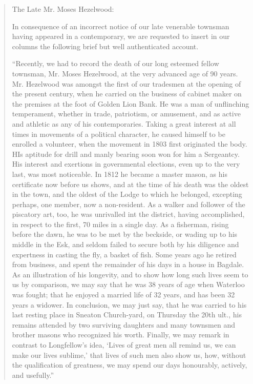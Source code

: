 \begin{quotation}
The Late Mr. Moses Hezelwood:

In consequence of an incorrect notice of our late venerable townsman having appeared in a contemporary,
we are requested to insert in our columns the following brief but well authenticated account.

``Recently, we had to record the death of our long esteemed fellow townsman, Mr. Moses Hezelwood, at the very advanced age of 90 years.
Mr. Hezelwood was amongst the first of our tradesmen at the opening of the present century,
when he carried on the business of cabinet maker on the premises at the foot of Golden Lion Bank.
He was a man of unflinching temperament, whether in trade, patriotism, or amusement, and as active and athletic as any of his contemporaries.
Taking a great interest at all times in movements of a political character, he caused himself to be enrolled a volunteer,
when the movement in 1803 first originated the body. HIs aptitude for drill and manly bearing soon won for him a Sergeantcy.
His interest and exertions in governmental elections, even up to the very last, was most noticeable.
In 1812 he became a master mason, as his certificate now before us shows, and at the time of his death was the oldest in the town,
and the oldest of the Lodge to which he belonged, excepting perhaps, one member, now a non-resident.
As a walker and follower of the piscatory art, too, he was unrivalled int the district, having accomplished,
in respect to the first, 70 miles in a single day. As a fisherman, rising before the dawn, he was to be met by the beckside,
or wading up to his middle in the Esk, and seldom failed to secure both by his diligence and expertness in casting the fly,
a basket of fish. Some years ago he retired from business, and spent the remainder of his days in a house in Bagdale.
As an illustration of his longevity, and to show how long such lives seem to us by comparison,
we may say that he was 38 years of age when Waterloo was fought; that he enjoyed a married life of 32 years,
and has been 32 years a widower. In conclusion, we may just say, that he was carried to his last resting place in Sneaton Church-yard,
on Thursday the 20th ult., his remains attended by two surviving daughters and many townsmen and brother masons who recognized his worth.
Finally, we may remark in contrast to Longfellow's idea, `Lives of great men all remind us, we can make our lives sublime,'
that lives of such men also show us, how, without the qualification of greatness, we may spend our days honourably, actively, and usefully.''
\end{quotation}
